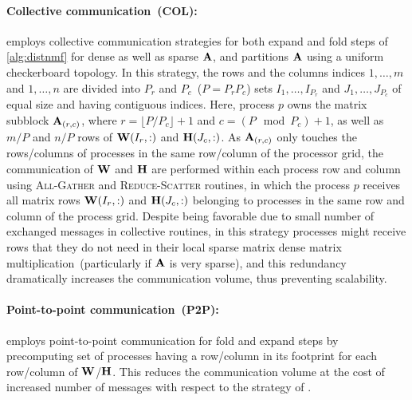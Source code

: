 \paragraph{Collective communication~(\textbf{COL}):} 
\mpifaun employs collective communication strategies for both expand and fold steps of \cref{alg:distnmf} for dense as well as sparse $\Am$, and partitions $\Am$ using a uniform checkerboard topology.
In this strategy, the rows and the columns indices $1, \dots, m$ and $1, \dots, n$ are divided into $P_r$ and $P_c$~($P = P_r P_c$) sets $I_1, \dots, I_{P_r}$ and $J_1, \dots, J_{P_c}$ of equal size and having contiguous indices.
Here, process $p$ owns the matrix subblock $\Am_{(r, c)}$, where $r = \lfloor P/P_c \rfloor + 1$ and $c = (P \mod P_c) + 1$, as well as $m / P$ and $n / P$ rows of $\Wm(I_r, :)$ and $\Hm(J_c, :)$.  
As $\Am_{(r, c)}$ only touches the rows/columns of processes in the same row/column of the processor grid, the communication of $\WW$ and $\HH$ are performed within each process row and column using \textsc{All-Gather} and \textsc{Reduce-Scatter} routines, in which the process $p$ receives all matrix rows $\Wm(I_r, :)$ and $\Hm(J_c, :)$ belonging to processes in the same row and column of the process grid.
Despite being favorable due to small number of exchanged messages in collective routines, in this strategy processes might receive rows that they do not need in their local sparse matrix dense matrix multiplication~(particularly if $\AA$ is very sparse), and this redundancy dramatically increases the communication volume, thus preventing scalability. 

\paragraph{Point-to-point communication~(\textbf{P2P}):} 
\hypertensor employs point-to-point communication for fold and expand steps by precomputing set of processes having a row/column in its footprint for each row/column of $\WW$/$\HH$.
This reduces the communication volume at the cost of increased number of messages with respect to the strategy of \mpifaun.


